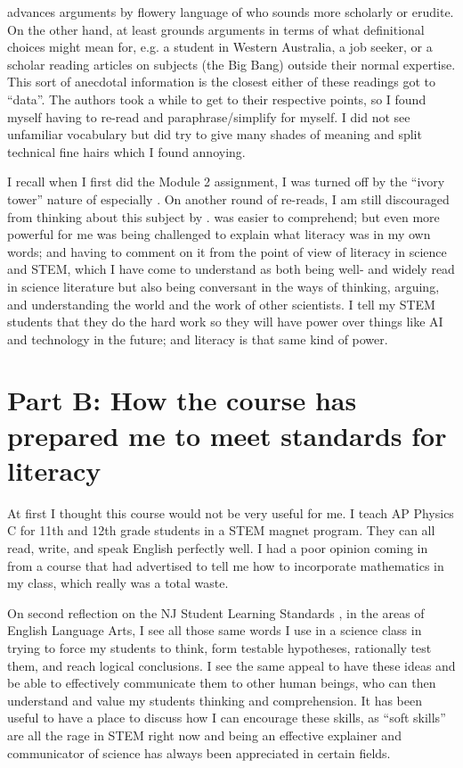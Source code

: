 \documentclass{article}
\begin{document}
\cite{gee89} advances arguments by flowery language of who sounds more scholarly or erudite. On the other hand, \cite{campbell90} at least grounds arguments in terms of what definitional choices might mean for, e.g. a student in Western Australia, a job seeker, or a scholar reading articles on subjects (the Big Bang) outside their normal expertise. This sort of anecdotal information is the closest either of these readings got to ``data''. The authors took a while to get to their respective points, so I found myself having to re-read and paraphrase/simplify for myself. I did not see unfamiliar vocabulary but \cite{gee89} did try to give many shades of meaning and split technical fine hairs which I found annoying. 

I recall when I first did the Module 2 assignment, I was turned off by the ``ivory tower'' nature of especially \cite{gee89}. On another round of re-reads, I am still discouraged from thinking about this subject by \cite{gee89}. \cite{campbell90} was easier to comprehend; but even more powerful for me was being challenged to explain what literacy was in my own words; and having to comment on it from the point of view of literacy in science and STEM, which I have come to understand as both being well- and widely read in science literature but also being conversant in the ways of thinking, arguing, and understanding the world and the work of other scientists. I tell my STEM students that they do the hard work so they will have power over things like AI and technology in the future; and literacy is that same kind of power. 





\section{Part B: How the course has prepared me to meet standards for literacy}
At first I thought this course would not be very useful for me. I teach AP Physics C for 11th and 12th grade students in a STEM magnet program. They can all read, write, and speak English perfectly well. I had a poor opinion coming in from a course that had advertised to tell me how to incorporate mathematics in my class, which really was a total waste. 

On second reflection on the NJ Student Learning Standards \cite{njsls}, in the areas of English Language Arts, I see all those same words I use in a science class in trying to force my students to think, form testable hypotheses, rationally test them, and reach logical conclusions. I see the same appeal to have these ideas and be able to effectively communicate them to other human beings, who can then understand and value my students thinking and comprehension. It has been useful to have a place to discuss how I can encourage these skills, as ``soft skills'' are all the rage in STEM right now and being an effective explainer and communicator of science has always been appreciated in certain fields. 
\end{document}
